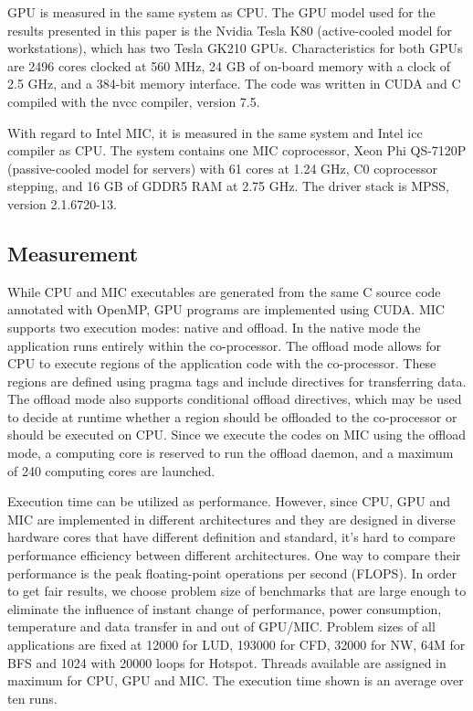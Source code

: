 
 GPU is measured in the same system as CPU. The GPU model used for the results presented in this paper is the Nvidia Tesla K80 (active-cooled model for workstations), which has two Tesla GK210 GPUs. Characteristics for both GPUs are 2496 cores clocked at 560 MHz, 24 GB of on-board memory with a clock of 2.5 GHz, and a 384-bit memory interface. The code was written in CUDA and C compiled with the nvcc compiler, version 7.5. 


With regard to Intel MIC, it is measured in the same system and Intel icc compiler as CPU. The system contains one MIC coprocessor, Xeon Phi QS-7120P (passive-cooled model for servers) with 61 cores at 1.24 GHz, C0 coprocessor stepping, and 16 GB of GDDR5 RAM at 2.75 GHz. The driver stack is MPSS, version 2.1.6720-13. 

\subsection{Measurement}

While CPU and MIC executables are generated from the same C source code annotated with OpenMP, GPU programs are implemented using CUDA. MIC supports two execution modes: native and offload. In the native mode the application runs entirely within the co-processor. The offload mode allows for CPU to execute regions of the application code with the co-processor. These regions are defined using pragma tags and include directives for transferring data. The offload mode also supports conditional offload directives, which may be used to decide at runtime whether a region should be offloaded to the co-processor or should be executed on CPU. Since we execute the codes on MIC using the offload mode, a computing core is reserved to run the offload daemon, and a maximum of 240 computing cores are launched.

Execution time can be utilized as performance. However, since CPU, GPU and MIC are implemented in different architectures and they are designed in diverse hardware cores that have different definition and standard, it's hard to compare performance efficiency between different architectures. One way to compare their performance is the peak floating-point operations per second (FLOPS). In order to get fair results, we choose problem size of benchmarks that are large enough to eliminate the influence of instant change of performance, power consumption, temperature and data transfer in and out of GPU/MIC. Problem sizes of all applications are fixed at 12000 for LUD, 193000 for CFD, 32000 for NW, 64M for BFS and 1024 with 20000 loops for Hotspot. Threads available are assigned in maximum for CPU, GPU and MIC. The execution time shown is an average over ten runs.

